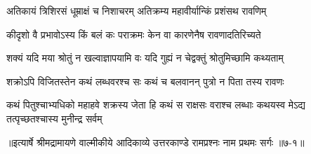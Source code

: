 \twolineshloka
{अतिकायं त्रिशिरसं धूम्राक्षं च निशाचरम्}
{अतिक्रम्य महावीर्यान्किं प्रशंसथ रावणिम्} %

\twolineshloka
{कीदृशो वै प्रभावोऽस्य किं बलं कः पराक्रमः}
{केन वा कारणेनैष रावणादतिरिच्यते} %

\twolineshloka
{शक्यं यदि मया श्रोतुं न खल्वाज्ञापयामि वः}
{यदि गुह्यं न चेद्वक्तुं श्रोतुमिच्छामि कथ्यताम्} %

\twolineshloka
{शक्रोऽपि विजितस्तेन कथं लब्धवरश्च सः}
{कथं च बलवानन् पुत्रो न पिता तस्य रावणः} %

\twolineshloka
{कथं पितुश्चाभ्यधिको महाहवे शक्रस्य जेता हि कथं स राक्षसः}
{वराश्च लब्धाः कथयस्व मेऽद्य तत्पृच्छतश्चास्य मुनीन्द्र सर्वम्} %


॥इत्यार्षे श्रीमद्रामायणे वाल्मीकीये आदिकाव्ये उत्तरकाण्डे रामप्रश्नः नाम प्रथमः सर्गः ॥७-१॥
